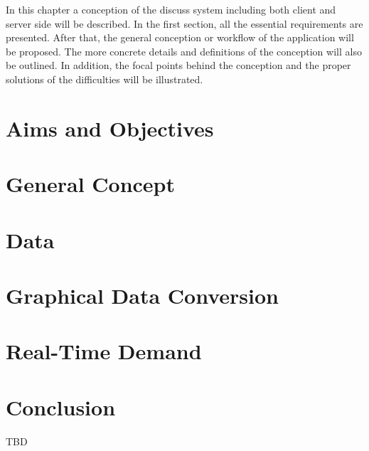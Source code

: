 In this chapter a conception of the discuss system including both client and server side will be described. In the first section, all the essential requirements are presented. After that, the general conception or workflow of the application will be proposed. The more concrete details and definitions of the conception will also be outlined. In addition, the focal points behind the conception and the proper solutions of the difficulties will be illustrated.


\section{Aims and Objectives}

\section{General Concept}

\section{Data}

\section{Graphical Data Conversion}

\section{Real-Time Demand}


% 

\section{Conclusion}
TBD